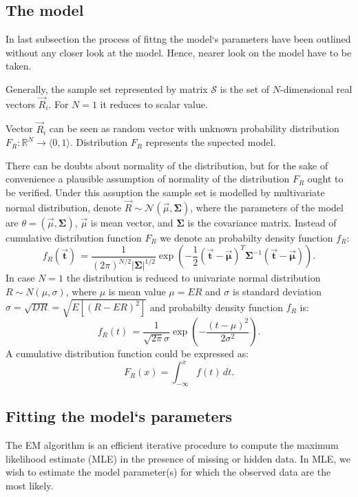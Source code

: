 \documentclass[a4paper,journal]{IEEEtran}
\begin{document}
\subsection{The model}
In last subsection the process of fittng the model`s parameters have been outlined without any closer look at the model.
Hence, nearer look on the model have to be taken.

Generally, the sample set represented by matrix  $\mathcal{S}$ is the set of $N$-dimensional real vectors $\vec{R}_i $.
For $N=1$ it reduces to scalar value.

Vector $\vec{R}_i$ can be seen as random vector with unknown probability distribution
$F_R: \mathbb{R}^N \rightarrow \langle 0, 1 \rangle $. Distribution $F_R$ represents the supected model.

There can be doubts about normality of the distribution, but for the sake of convenience a plausible assumption of 
normality of the distribution $F_R$  ought to be verified. Under this assuption the sample set is modelled by multivariate 
normal distribution, denote $\vec{R} \sim \mathcal{N}(\vec{\mu},\mathbf \Sigma)$, where the parameters of the model are 
$\theta = (\vec{\mu}, \mathbf\Sigma)$, $\vec{\mu}$ is mean vector, and $\mathbf\Sigma$ is the covariance matrix. 
Instead of cumulative distribution function $F_R$ we denote an probabilty density function $f_R$:
\begin{equation}
f_R(\vec{\mathbf{t}})\, =
\frac{1}{(2\pi)^{N/2}|\mathbf\Sigma|^{1/2}}
\exp \left(-\frac{1}{2}({\mathbf{\vec t}}-{\mathbf{\vec\mu}})^T{\mathbf\Sigma}^{-1}({\mathbf{\vec t}}-\mathbf{\vec\mu})
\right).
\end{equation}
In case $N=1$ the distribution is reduced to univariate normal distribution $R \sim N(\mu,\sigma)$, where $\mu$ is 
mean value $\mu = ER$ and $\sigma$ is standard deviation $\sigma = \sqrt{DR} = \sqrt{E[(R - ER)^2] }$ and 
probabilty density function $f_R$ is:
\begin{equation}
f_R(t)\, =
\frac{1}{\sqrt{2\pi}\sigma}
\exp \left(-\frac{(t-\mu)^2}{2\sigma^2}
\right).
\end{equation}
A cumulative distribution function could be expressed as:
\begin{equation}
F_R(x) = \int_{-\infty}^x f(t)\,dt.
\end{equation}

\subsection{Fitting the model`s parameters}
The EM algorithm is an efficient iterative procedure to compute the maximum likelihood estimate (MLE) in the
presence of missing or hidden data. In MLE, we wish to estimate the model parameter(s) for which the observed
data are the most likely.
\end{document}
